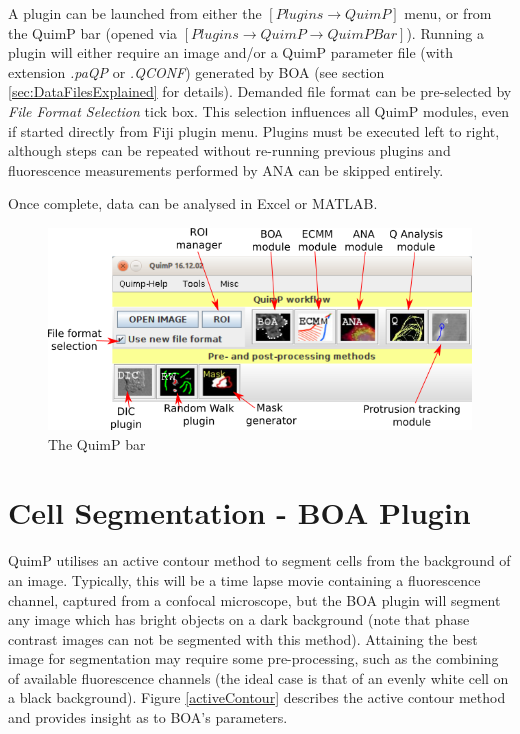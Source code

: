 \documentclass[a4paper,12pt]{article}
\begin{document}
A plugin can be launched from either the $[Plugins\rightarrow QuimP]$ menu, or from the QuimP bar
(opened via $[Plugins\rightarrow QuimP\rightarrow QuimP Bar]$).
Running a plugin will either require an image and/or a QuimP parameter file (with extension \textit{.paQP} or  \textit{.QCONF}) generated by BOA (see section \ref{sec:DataFilesExplained} for details). Demanded file format can be pre-selected by \textit{File Format Selection} tick box. This selection influences all QuimP modules, even if started directly from Fiji plugin menu.
Plugins must be executed left to right, although steps can be repeated without re-running previous plugins and fluorescence measurements performed by ANA can be skipped entirely.

Once complete, data can be analysed in Excel or MATLAB.

\begin{figure}[ht]
   \centering
   \includegraphics[width=15cm]{quimpBar.png} %
   \caption{The QuimP bar}
   \label{fig:quimpBar}
\end{figure}


\section{Cell Segmentation - BOA Plugin}
\label{sec:BOAPlugin}
QuimP utilises an active contour method to segment cells from the background of an image.  Typically, this will be a 
time lapse movie containing a fluorescence channel, captured from a confocal microscope, but the BOA plugin will 
segment any image which has bright objects on a dark background (note that phase contrast images can not be 
segmented with this method).  Attaining the best image for segmentation may require some pre-processing, such 
as the combining of available fluorescence channels (the ideal case is that of an evenly white cell on a black 
background).  Figure \ref{activeContour} describes the active contour method and provides insight as to BOA's 
parameters.
\\\\
\noindent{}
\end{document}
